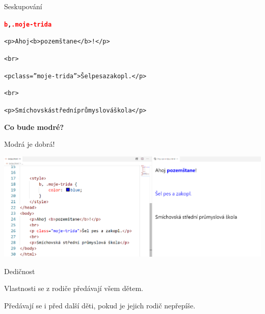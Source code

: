 \documentclass[aspectratio=1610]{beamer}
\begin{document}
\begin{frame}{Seskupování}
    \begin{cardTiny}
        \begin{flushleft}
            \begin{alltt}
                \textbf{\textcolor{red}{b}, \textcolor{red}{.moje-trida}} \string{\\
                    \textcolor{blue}{color}: \textcolor{orange}{blue};\\
                \string}
            \end{alltt}
            \begin{alltt}
                <p>Ahoj <b>pozemštane</b>!</p>

                <br>
                
                <p class=''moje-trida''>Šel pes a zakopl.</p>
                
                <br>
                
                <p>Smíchovská střední průmyslová škola</p>
            \end{alltt}
        \end{flushleft}
    \end{cardTiny}
    \begin{cardTiny}
        \begin{center}
            \textbf{Co bude modré?}
        \end{center}
    \end{cardTiny}
\end{frame}

\begin{frame}{Modrá je dobrá!}
    \begin{center}
        \includegraphics[width=\textwidth]{img/html-7-8-2.png}
    \end{center}
\end{frame}

\begin{frame}{Dedičnost}
    \begin{cardTiny}
        Vlastnosti se z rodiče předávají všem dětem.

        Předávají se i před další děti, pokud je jejich rodič nepřepíše.
    \end{cardTiny}
\end{frame}
\end{document}
